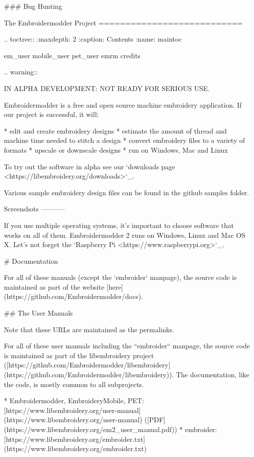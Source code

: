 ### Bug Hunting

The Embroidermodder Project
===========================

.. toctree::
   :maxdepth: 2
   :caption: Contents
   :name: maintoc

   em_user
   mobile_user
   pet_user
   emrm
   credits

.. warning::

   IN ALPHA DEVELOPMENT: NOT READY FOR SERIOUS USE.

Embroidermodder is a free and open source machine embroidery application.
If our project is successful, it will:

  * edit and create embroidery designs
  * estimate the amount of thread and machine time needed to stitch a design
  * convert embroidery files to a variety of formats
  * upscale or downscale designs
  * run on Windows, Mac and Linux

To try out the software in alpha see our `downloads page <https://libembroidery.org/downloads>`_.

Various sample embroidery design files can be found in
the github samples folder.

Screenshots
-----------

If you use multiple operating systems, it's important to choose
software that works on all of them. Embroidermodder 2 runs on Windows,
Linux and Mac OS X. Let's not forget the `Raspberry Pi <https://www.raspberrypi.org>`_.

# Documentation

For all of these manuals (except the `embroider` manpage),
the source code is maintained as part
of the website [here](https://github.com/Embroidermodder/docs).

## The User Manuals

Note that these URLs are maintained as the permalinks.

For all of these user manuals including the ``embroider`` manpage,
the source code is maintained as part
of the libembroidery project ([https://github.com/Embroidermodder/libembroidery](https://github.com/Embroidermodder/libembroidery)).
The documentation, like the code, is mostly common to all subprojects.

* Embroidermodder, EmbroideryMobile, PET: [https://www.libembroidery.org/user-manual](https://www.libembroidery.org/user-manual) ([PDF](https://www.libembroidery.org/em2_user_manual.pdf))
* embroider: [https://www.libembroidery.org/embroider.txt](https://www.libembroidery.org/embroider.txt)


